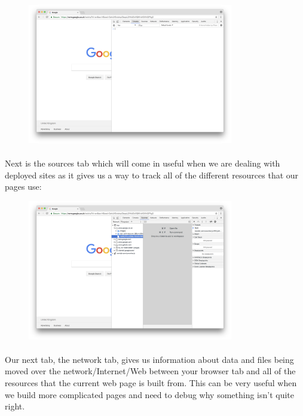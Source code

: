 \begin{figure}[H]
\centering
\includegraphics[width=0.8\textwidth]{figures/devtools_console.png}
\label{fig:devtools_console}
\end{figure}


\paragraph{} Next is the sources tab which will come in useful when we are dealing with deployed sites as it gives us a way to track all of the different resources that our pages use:


\begin{figure}[H]
\centering
\includegraphics[width=0.8\textwidth]{figures/devtools_sources.png}
\label{fig:devtools_sources}
\end{figure}

\paragraph{} Our next tab, the network tab, gives us information about data and files being moved over the network/Internet/Web between your browser tab and all of the resources that the current web page is built from. This can be very useful when we build more complicated pages and need to debug why something isn't quite right.

